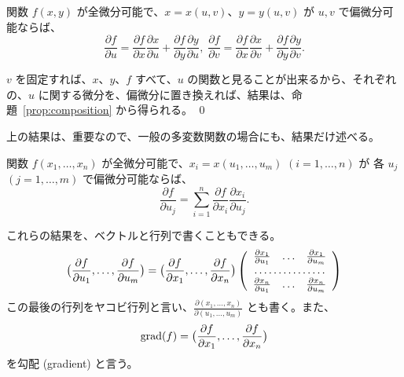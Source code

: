 \begin{thm} \label{thm:chainrule}
関数 $f(x,y)$ が全微分可能で、$x = x(u,v)$、$y = y(u,v)$ が $u,v$ で偏微分可能ならば、
$$\frac{\partial f}{\partial u} = \frac{\partial f}{\partial x}\frac{\partial x}{\partial u} + \frac{\partial f}{\partial y}\frac{\partial y}{\partial u}, \;
\frac{\partial f}{\partial v} = \frac{\partial f}{\partial x}\frac{\partial x}{\partial v} + \frac{\partial f}{\partial y}\frac{\partial y}{\partial v}.$$
\end{thm}
\proof
$v$ を固定すれば、$x$、$y$、$f$  すべて、$u$ の関数と見ることが出来るから、それぞれの、$u$ に関する微分を、偏微分に置き換えれば、結果は、命題~\ref{prop:composition} から得られる。
\qed

\medskip
上の結果は、重要なので、一般の多変数関数の場合にも、結果だけ述べる。
\begin{thm} \label{thm:chainrule:gen}
関数 $f(x_1, \ldots, x_n)$ が全微分可能で、$x_i = x(u_1,\ldots, u_m)$ $(i = 1, \ldots, n)$ が 各 $u_j$  $(j = 1, \ldots, m)$ で偏微分可能ならば、
$$\frac{\partial f}{\partial u_j} = \sum_{i=1}^n\frac{\partial f}{\partial x_i}\frac{\partial x_i}{\partial u_j}.$$
\end{thm}

これらの結果を、ベクトルと行列で書くこともできる。
$$\bigl(\frac{\partial f}{\partial {u_1}},\ldots, \frac{\partial f}{\partial {u_m}}\bigr)= \bigl(\frac{\partial f}{\partial {x_1}},\ldots, \frac{\partial f}{\partial {x_n}}\bigr)\left(\begin{array}{ccc}
\frac{\partial x_1}{\partial {u_1}} & \ldots & \frac{\partial x_1}{\partial {u_m}}\\
\multicolumn{3}{c}{\dotfill}\\
\frac{\partial x_n}{\partial {u_1}} & \ldots & \frac{\partial x_n}{\partial {u_m}}
\end{array}\right)$$
この最後の行列をヤコビ行列と言い、${\displaystyle \frac{\partial(x_1, \ldots, x_n)}{\partial(u_1,\ldots, u_m)}}$ とも書く。また、
$$\mbox{grad}(f) = \bigl(\frac{\partial f}{\partial {x_1}},\ldots, \frac{\partial f}{\partial {x_n}}\bigr)$$
を勾配 (gradient) と言う。

